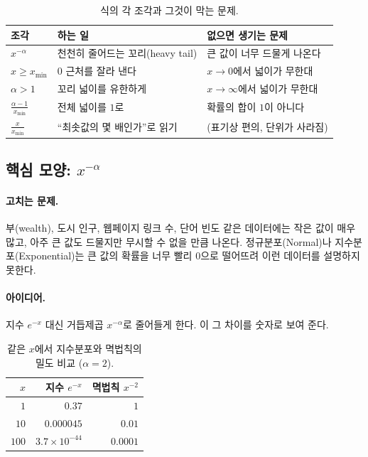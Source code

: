 \documentclass[11pt]{article}
\begin{document}
\begin{table}[H]
  \centering
  \caption{식의 각 조각과 그것이 막는 문제.}
  \label{tab:why-pieces}
  \begin{tabular}{lll}
    \toprule
    조각 & 하는 일 & 없으면 생기는 문제 \\
    \midrule
    $x^{-\alpha}$ & 천천히 줄어드는 꼬리(heavy tail) & 큰 값이 너무 드물게 나온다 \\
    \midrule
    $x \ge x_{\min}$ & $0$ 근처를 잘라 낸다 & $x \to 0$에서 넓이가 무한대 \\
    \midrule
    $\alpha > 1$ & 꼬리 넓이를 유한하게 & $x \to \infty$에서 넓이가 무한대 \\
    \midrule
    $\frac{\alpha-1}{x_{\min}}$ & 전체 넓이를 $1$로 & 확률의 합이 $1$이 아니다 \\
    \midrule
    $\frac{x}{x_{\min}}$ & ``최솟값의 몇 배인가''로 읽기 & (표기상 편의, 단위가 사라짐) \\
    \bottomrule
  \end{tabular}
\end{table}


\subsection{핵심 모양: $x^{-\alpha}$}
\label{sec:why-shape}

\paragraph{고치는 문제.}
부(wealth), 도시 인구, 웹페이지 링크 수, 단어 빈도 같은 데이터에는 작은 값이 매우 많고,
아주 큰 값도 드물지만 무시할 수 없을 만큼 나온다. 정규분포(Normal)나
지수분포(Exponential)는 큰 값의 확률을 너무 빨리 $0$으로 떨어뜨려 이런 데이터를
설명하지 못한다.

\paragraph{아이디어.}
지수 $e^{-x}$ 대신 거듭제곱 $x^{-\alpha}$로 줄어들게 한다. 이 그 차이를
숫자로 보여 준다.

\begin{table}[H]
  \centering
  \caption{같은 $x$에서 지수분포와 멱법칙의 밀도 비교 ($\alpha = 2$).}
  \label{tab:why-tail}
  \begin{tabular}{rrr}
    \toprule
    $x$ & 지수 $e^{-x}$ & 멱법칙 $x^{-2}$ \\
    \midrule
    $1$ & $0.37$ & $1$ \\
    \midrule
    $10$ & $0.000045$ & $0.01$ \\
    \midrule
    $100$ & $3.7 \times 10^{-44}$ & $0.0001$ \\
    \bottomrule
  \end{tabular}
\end{table}
\end{document}
